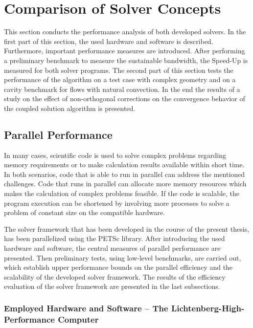 \section{Comparison of Solver Concepts}
\label{sec:compare}

This section conducts the performance analysis of both developed solvers. In the first part of this section, the used hardware and software is described. Furthermore, important performance measures are introduced. After performing a preliminary benchmark to measure the sustainable bandwidth, the Speed-Up is measured for both solver programs. The second part of this section tests the performance of the algorithm on a test case with complex geometry and on a cavity benchmark for flows with natural convection. In the end the results of a study on the effect of non-orthogonal corrections on the convergence behavior of the coupled solution algorithm is presented.
  
\subsection{Parallel Performance}

In many cases, scientific code is used to solve complex problems regarding memory requirements or to make calculation results available within short time. In both scenarios, code that is able to run in parallel can address the mentioned challenges. Code that runs in parallel can allocate more memory resources which makes the calculation of complex problems feasible. If the code is scalable, the program execution can be shortened by involving more processes to solve a problem of constant size on the compatible hardware.

The solver framework that has been developed in the course of the present thesis, has been parallelized using the PETSc library. After introducing the used hardware and software, the central measures of parallel performance are presented. Then preliminary tests, using low-level benchmarks, are carried out, which establish upper performance bounds on the parallel efficiency and the scalability of the developed solver framework. The results of the efficiency evaluation of the solver framework are presented in the last subsections.

\subsubsection{Employed Hardware and Software -- The Lichtenberg-High-Performance Computer }
\label{sec:hhlr}

